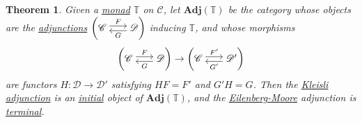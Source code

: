 \documentclass{article}
\newenvironment{tikzcdi}{\begin{tikzcd}[cramped, sep=scriptsize]}{\end{tikzcd}}
\newtheorem{nthm}{Theorem}[section]
\begin{document}
\begin{nthm}\label{thm:5.7}
  Given a \hyperlink{def:monad}{monad} $\mathbb{T}$ on $\mathscr{C}$, let $\mathbf{Adj}(\mathbb{T})$ be the category whose objects are the \hyperlink{def:adj}{adjunctions}
  $\left(\begin{tikzcdi}\mathscr{C} \rar[shift left]{F} & \mathscr{D} \lar[shift left]{G}\end{tikzcdi}\right)$
  inducing $\mathbb{T}$, and whose morphisms
  \begin{equation*}\left(\begin{tikzcdi}\mathscr{C} \rar[shift left]{F} & \mathscr{D} \lar[shift left]{G}\end{tikzcdi}\right)\to \left(\begin{tikzcdi}\mathscr{C} \rar[shift left]{F'} & \mathscr{D}' \lar[shift left]{G'}\end{tikzcdi}\right)\end{equation*}
  are functors $H: \mathscr{D} \to \mathscr{D}'$ satisfying $HF = F'$ and $G'H = G$.
  Then the \hyperlink{def:kleisli}{Kleisli} \hyperlink{def:adj}{adjunction} is an \hyperlink{def:initial}{initial} object of $\mathbf{Adj}(\mathbb{T})$, and the \hyperlink{def:em}{Eilenberg-Moore} adjunction is \hyperlink{def:terminal}{terminal}.
\end{nthm}
\end{document}

